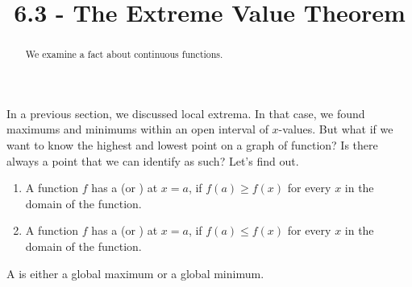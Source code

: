 \documentclass{ximera}
\title{6.3 - The Extreme Value Theorem}
\begin{document}
\begin{abstract}
  We examine a fact about continuous functions.
\end{abstract}
\maketitle
In a previous section, we discussed local extrema. In that case, we found maximums and minimums within an open interval of $x$-values. But what if we want to know the highest and lowest point on a graph of function? Is there always a point that we can identify as such? Let's find out. 

\begin{definition}\hfil{}
\begin{enumerate}
\item A function $f$ has a  (or ) at $x=a$, if $f(a)\ge
  f(x)$ for every $x$ in the domain of the function.
\item A function $f$ has a  (or ) at $x=a$, if $f(a)\le
  f(x)$ for every $x$ in the domain of the function.
\end{enumerate} 
A  is either a
global maximum or a global minimum.
\end{definition}
\end{document}

